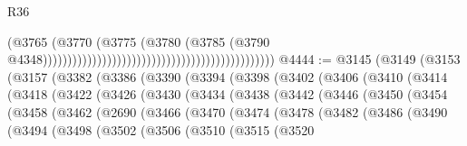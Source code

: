 \begin{lexlean}{R36}
\begin{coremodule}
                                                                                      (@3765
                                                                                        (@3770
                                                                                          (@3775
                                                                                            (@3780
                                                                                              (@3785
                                                                                                (@3790
                                                                                                  @4348)))))))))))))))))))))))))))))))))))))))))))))))
@4444 := @3145
    (@3149
      (@3153
        (@3157
          (@3382
            (@3386
              (@3390
                (@3394
                  (@3398
                    (@3402
                      (@3406
                        (@3410
                          (@3414
                            (@3418
                              (@3422
                                (@3426
                                  (@3430
                                    (@3434
                                      (@3438
                                        (@3442
                                          (@3446
                                            (@3450
                                              (@3454
                                                (@3458
                                                  (@3462
                                                    (@2690
                                                      (@3466
                                                        (@3470
                                                          (@3474
                                                            (@3478
                                                              (@3482
                                                                (@3486
                                                                  (@3490
                                                                    (@3494
                                                                      (@3498
                                                                        (@3502
                                                                          (@3506
                                                                            (@3510
                                                                              (@3515
                                                                                (@3520

\end{coremodule}
\end{lexlean}
